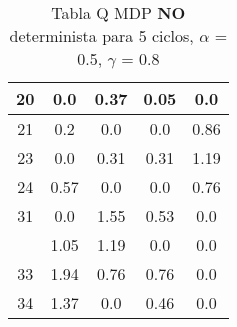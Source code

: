 \documentclass[10pt, spanish, pdftex]{../.template/template}
\begin{document}
\begin{table}[h!]
\begin{tabular}{c|c|c|c|c|}
    \multicolumn{1}{|c|}{20}                        & 0.0                          & 0.37                         & 0.05 & 0.0                          \\ \hline
    \multicolumn{1}{|c|}{21}                        & 0.2                         & 0.0                          & 0.0  & 0.86                         \\ \hline
    \multicolumn{1}{|c|}{23}                        & 0.0                          & 0.31                         & 0.31 & \cellcolor[HTML]{FD6864}1.19 \\ \hline
    \multicolumn{1}{|c|}{24}                        & 0.57                         & 0.0                          & 0.0  & 0.76                         \\ \hline
    \multicolumn{1}{|c|}{31}                        & 0.0                          & 1.55                         & 0.53 & 0.0                          \\ \hline
    \rowcolor[HTML]{9AFF99} 
    \multicolumn{1}{|c|}{\cellcolor[HTML]{9AFF99}S} & 1.05                         & 1.19                         & 0.0  & 0.0                          \\ \hline
    \multicolumn{1}{|c|}{33}                        & \cellcolor[HTML]{FD6864}1.94 & 0.76                         & 0.76 & 0.0                          \\ \hline
    \multicolumn{1}{|c|}{34}                        & 1.37                         & 0.0                          & 0.46 & 0.0                          \\ \hline
    \end{tabular}
    \caption{Tabla Q MDP \textbf{NO} determinista para 5 ciclos, $\alpha$ = 0.5, $\gamma$ = 0.8}
\end{table}
\end{document}
